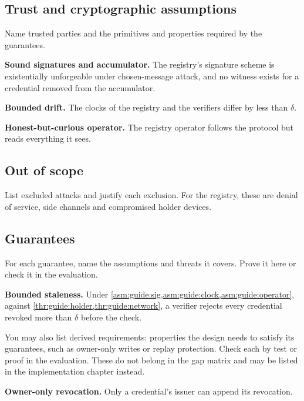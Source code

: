\subsection[Trust and cryptographic assumptions]{Trust and cryptographic assumptions\skimmark}\label{app:chapters:assumptions}
Name trusted parties and the primitives and properties required by the guarantees.
\begin{assumptions}
  \item\label{asm:guide:sig} \textbf{Sound signatures and accumulator.} The registry's signature scheme is existentially unforgeable under chosen-message attack, and no witness exists for a credential removed from the accumulator.
  \item\label{asm:guide:clock} \textbf{Bounded drift.} The clocks of the registry and the verifiers differ by less than $\delta$.
  \item\label{asm:guide:operator} \textbf{Honest-but-curious operator.} The registry operator follows the protocol but reads everything it sees.
\end{assumptions}

\subsection{Out of scope}\label{app:chapters:out-of-scope}
List excluded attacks and justify each exclusion. For the registry, these are denial of service, side channels and compromised holder devices.

\subsection[Guarantees]{Guarantees\skimmark}\label{app:chapters:guarantees}
For each guarantee, name the assumptions and threats it covers. Prove it here or check it in the evaluation.
\begin{guarantees}
  \item\label{g:guide:stale} \textbf{Bounded staleness.} Under \cref{asm:guide:sig,asm:guide:clock,asm:guide:operator}, against \cref{thr:guide:holder,thr:guide:network}, a verifier rejects every credential revoked more than $\delta$ before the check.
\end{guarantees}

You may also list derived requirements: properties the design needs to satisfy its guarantees, such as owner-only writes or replay protection. Check each by test or proof in the evaluation. These do not belong in the gap matrix and may be listed in the implementation chapter instead.
\begin{derivedrequirements}
  \item\label{dr:guide:owner} \textbf{Owner-only revocation.} Only a credential's issuer can append its revocation.
\end{derivedrequirements}

